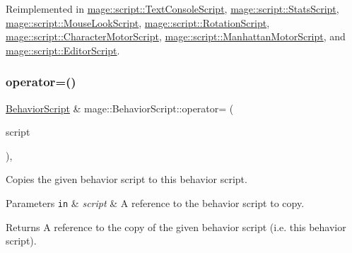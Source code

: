 Reimplemented in \hyperlink{classmage_1_1script_1_1_text_console_script_a1e5a7bdff2d47b835932d7220a4e2571}{mage\+::script\+::\+Text\+Console\+Script}, \hyperlink{classmage_1_1script_1_1_stats_script_a4bfada754da5ca76591c5e7b9b0b1f51}{mage\+::script\+::\+Stats\+Script}, \hyperlink{classmage_1_1script_1_1_mouse_look_script_a00c8dc8ebaf67da13bd0bc45de3ad8b6}{mage\+::script\+::\+Mouse\+Look\+Script}, \hyperlink{classmage_1_1script_1_1_rotation_script_a7da4165e899facc981c0ee5b1f4a4453}{mage\+::script\+::\+Rotation\+Script}, \hyperlink{classmage_1_1script_1_1_character_motor_script_a20699adf280bed4bfadd4a89d7df33c1}{mage\+::script\+::\+Character\+Motor\+Script}, \hyperlink{classmage_1_1script_1_1_manhattan_motor_script_ac93b09e8f82932f7071b1f591a8004e9}{mage\+::script\+::\+Manhattan\+Motor\+Script}, and \hyperlink{classmage_1_1script_1_1_editor_script_af0804c603852f556d362f43e69240b2d}{mage\+::script\+::\+Editor\+Script}.

\hypertarget{classmage_1_1_behavior_script_adb153676123adadacf023e4f3804abf5}{}\label{classmage_1_1_behavior_script_adb153676123adadacf023e4f3804abf5} 
\subsubsection{\texorpdfstring{operator=()}{operator=()}\hspace{0.1cm}{\footnotesize\ttfamily [1/2]}}
{\footnotesize\ttfamily \hyperlink{classmage_1_1_behavior_script}{Behavior\+Script} \& mage\+::\+Behavior\+Script\+::operator= (\begin{DoxyParamCaption}\item[{const \hyperlink{classmage_1_1_behavior_script}{Behavior\+Script} \&}]{script }\end{DoxyParamCaption})\hspace{0.3cm}{\ttfamily [default]}, {\ttfamily [noexcept]}}

Copies the given behavior script to this behavior script.


\begin{DoxyParams}[1]{Parameters}
\mbox{\tt in}  & {\em script} & A reference to the behavior script to copy. \\
\hline
\end{DoxyParams}
\begin{DoxyReturn}{Returns}
A reference to the copy of the given behavior script (i.\+e. this behavior script). 
\end{DoxyReturn}
\hypertarget{classmage_1_1_behavior_script_aefeae227ee8d2452bf05782604f5011e}{}\label{classmage_1_1_behavior_script_aefeae227ee8d2452bf05782604f5011e} 
